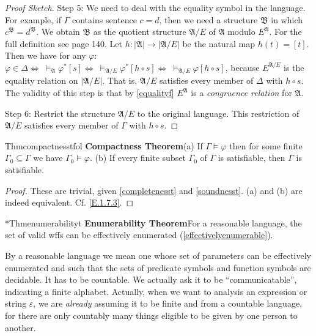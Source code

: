 \begin{proof}[Proof Sketch]
  Step 5: We need to deal with the equality symbol in the language. For example, if $\Gamma$ contains sentence $c=d$, then we need a structure $\mathfrak{B}$ in which $c^{\mathfrak{B}}=d^{\mathfrak{B}}.$ We obtain $\mathfrak{B}$ as the quotient structure $\mathfrak{A}/E$ of $\mathfrak{A}$ modulo $E^{\mathfrak{A}}$. For the full definition see page 140. Let $h:|\mathfrak{A}|\rightarrow|\mathfrak{A}/E|$ be the natural map $h(t)=[t]$. Then we have for any $\varphi$: $\varphi\in \Delta \Leftrightarrow\ \vDash_{\mathfrak{A}}\varphi^*[s]\Leftrightarrow\ \vDash_{\mathfrak{A}/E}\varphi^*[h\circ s]\Leftrightarrow\ \vDash_{\mathfrak{A}/E}\varphi[h\circ s]$, because $E^{\mathfrak{A}/E}$ is the equality relation on $|\mathfrak{A}/E|$. That is, $\mathfrak{A}/E$ satisfies every member of $\Delta$ with $h\circ s$. The validity of this step is that by \ref{equalityf} $E^{\mathfrak{A}}$ is a \textit{congruence relation} for $\mathfrak{A}$.

  Step 6: Restrict the structure $\mathfrak{A}/E$ to the original language. This restriction of $\mathfrak{A}/E$ satisfies every member of $\Gamma$ with $h\circ s$.
\end{proof}


\begin{reference}{Thm}{compactnesstfol}
  \textbf{Compactness Theorem}\quad(a) If $\Gamma\vDash \varphi$ then for some finite $\Gamma_0\subseteq \Gamma$ we have $\Gamma_0\vDash \varphi$. (b) If every finite subset $\Gamma_0$ of $\Gamma$ is satisfiable, then $\Gamma$ is satisfiable.
\end{reference}

\begin{proof}
  These are trivial, given \ref{completenesst} and \ref{soundnesst}. (a) and (b) are indeed equivalent. Cf. \ref{E.1.7.3}.
\end{proof}


\begin{reference}{*Thm}{enumerabilityt}
  \textbf{Enumerability Theorem}\quad For a reasonable language, the set of valid wffs can be effectively enumerated (\ref{effectivelyenumerable}).
\end{reference}


By a reasonable language we mean one whose set of parameters can be effectively enumerated and such that the sets of predicate symbols and function symbols are decidable. It has to be countable. We actually ask it to be ``communicatable'', indicating a finite alphabet. Actually, when we want to analysis an expression or string $\varepsilon$, we are \textit{already} assuming it to be finite and from a countable language, for there are only countably many things eligible to be given by one person to another.

